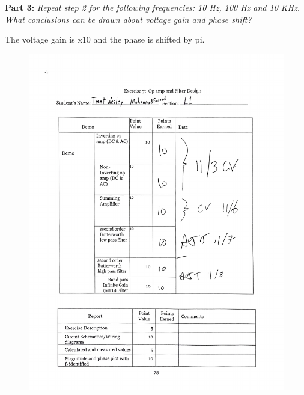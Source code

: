 \documentclass[CMPE]{KGCOEReport}
\begin{document}
\textbf{Part 3:} \emph{Repeat step 2 for the following frequencies: 10 Hz, 100 Hz and 10 KHz. What conclusions can be drawn about voltage gain and phase shift?}

The voltage gain is x10 and the phase is shifted by pi.

\newpage
\begin{figure}[H]
    \centering
    \begin{adjustbox}{center}
        \includegraphics[width=1.26\textwidth]{signoff.pdf}
    \end{adjustbox}
\end{figure}
\end{document}
